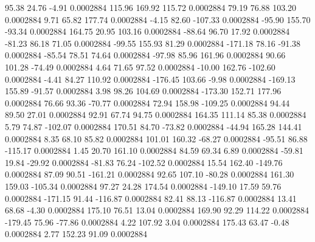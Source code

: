        95.38       24.76       -4.91     0.0002884
      115.96      169.92      115.72     0.0002884
       79.19       76.88      103.20     0.0002884
        9.71       65.82      177.74     0.0002884
       -4.15       82.60     -107.33     0.0002884
      -95.90      155.70      -93.34     0.0002884
      164.75       20.95      103.16     0.0002884
      -88.64       96.70       17.92     0.0002884
      -81.23       86.18       71.05     0.0002884
      -99.55      155.93       81.29     0.0002884
     -171.18       78.16      -91.38     0.0002884
      -85.54       78.51       74.64     0.0002884
      -97.98       85.96      161.96     0.0002884
       90.66      101.28      -74.49     0.0002884
        4.64       71.65       97.52     0.0002884
      -10.00      162.76     -102.60     0.0002884
       -4.41       84.27      110.92     0.0002884
     -176.45      103.66       -9.98     0.0002884
     -169.13      155.89      -91.57     0.0002884
        3.98       98.26      104.69     0.0002884
     -173.30      152.71      177.96     0.0002884
       76.66       93.36      -70.77     0.0002884
       72.94      158.98     -109.25     0.0002884
       94.44       89.50       27.01     0.0002884
       92.91       67.74       94.75     0.0002884
      164.35      111.14       85.38     0.0002884
        5.79       74.87     -102.07     0.0002884
      170.51       84.70      -73.82     0.0002884
      -44.94      165.28      144.41     0.0002884
        8.35       68.10       85.82     0.0002884
      101.01      160.32      -68.27     0.0002884
      -95.51       86.88     -115.17     0.0002884
        1.45       20.70      161.10     0.0002884
       84.59       69.34        6.89     0.0002884
      -59.81       19.84      -29.92     0.0002884
      -81.83       76.24     -102.52     0.0002884
       15.54      162.40     -149.76     0.0002884
       87.09       90.51     -161.21     0.0002884
       92.65      107.10      -80.28     0.0002884
      161.30      159.03     -105.34     0.0002884
       97.27       24.28      174.54     0.0002884
     -149.10       17.59       59.76     0.0002884
     -171.15       91.44     -116.87     0.0002884
       82.41       88.13     -116.87     0.0002884
       13.41       68.68       -4.30     0.0002884
      175.10       76.51       13.04     0.0002884
      169.90       92.29      114.22     0.0002884
     -179.45       75.96      -77.86     0.0002884
        4.22      107.92        3.04     0.0002884
      175.43       63.47       -0.48     0.0002884
        2.77      152.23       91.09     0.0002884
